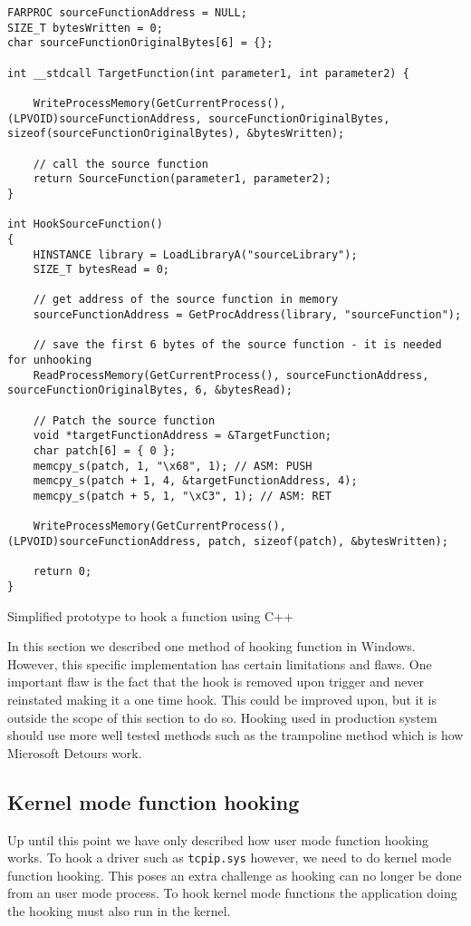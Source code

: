 \documentclass{report}
\begin{document}
\begin{listing}[H]
\begin{verbatim}
FARPROC sourceFunctionAddress = NULL;
SIZE_T bytesWritten = 0;
char sourceFunctionOriginalBytes[6] = {};

int __stdcall TargetFunction(int parameter1, int parameter2) {
	
	WriteProcessMemory(GetCurrentProcess(), (LPVOID)sourceFunctionAddress, sourceFunctionOriginalBytes, sizeof(sourceFunctionOriginalBytes), &bytesWritten);
	
	// call the source function
	return SourceFunction(parameter1, parameter2);
}

int HookSourceFunction()
{
	HINSTANCE library = LoadLibraryA("sourceLibrary");
	SIZE_T bytesRead = 0;
	
	// get address of the source function in memory
	sourceFunctionAddress = GetProcAddress(library, "sourceFunction");

	// save the first 6 bytes of the source function - it is needed for unhooking
	ReadProcessMemory(GetCurrentProcess(), sourceFunctionAddress, sourceFunctionOriginalBytes, 6, &bytesRead);
	
    // Patch the source function
	void *targetFunctionAddress = &TargetFunction;
	char patch[6] = { 0 };
	memcpy_s(patch, 1, "\x68", 1); // ASM: PUSH
	memcpy_s(patch + 1, 4, &targetFunctionAddress, 4);
	memcpy_s(patch + 5, 1, "\xC3", 1); // ASM: RET

	WriteProcessMemory(GetCurrentProcess(), (LPVOID)sourceFunctionAddress, patch, sizeof(patch), &bytesWritten);

	return 0;
}
\end{verbatim}
\caption{Simplified prototype to hook a function using C++}
\label{listing:c:hooking-prototype}
\end{listing}

In this section we described one method of hooking function in Windows. However, this specific implementation has certain limitations and flaws. One important flaw is the fact that the hook is removed upon trigger and never reinstated making it a one time hook. This could be improved upon, but it is outside the scope of this section to do so. Hooking used in production system should use more well tested methods such as the trampoline method\cite{url:hooking:halladay} which is how Microsoft Detours work\cite{url:hooking:detours}.

\subsection{Kernel mode function hooking}
\label{sec:hooking:kernel-mode}
Up until this point we have only described how user mode function hooking works. To hook a driver such as \texttt{tcpip.sys} however, we need to do kernel mode function hooking. This poses an extra challenge as hooking can no longer be done from an user mode process. To hook kernel mode functions the application doing the hooking must also run in the kernel.
\end{document}
